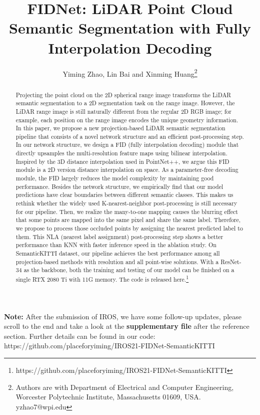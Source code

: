 \documentclass[letterpaper, 10 pt, conference]{ieeeconf}
\title{\LARGE \bf
FIDNet: LiDAR Point Cloud Semantic Segmentation with Fully Interpolation Decoding}
\author{Yiming Zhao, Lin Bai and Xinming Huang\thanks{Authors are with Department of Electrical and Computer Engineering, Worcester Polytechnic Institute,
        Massachusetts 01609, USA.
        yzhao7@wpi.edu}}
\begin{document}
\maketitle
\thispagestyle{empty}
\pagestyle{empty}




\textbf{Note: }  After the submission of IROS, we have some follow-up updates, please scroll to the end and take a look at the \textbf{supplementary file} after the reference section. Further details can be found in our code: https://github.com/placeforyiming/IROS21-FIDNet-SemanticKITTI \newline

\begin{abstract}

Projecting the point cloud on the 2D spherical range image transforms the LiDAR semantic segmentation to a 2D segmentation task on the range image. However, the LiDAR range image is still naturally different from the regular 2D RGB image; for example, each position on the range image encodes the unique geometry information. In this paper, we propose a new projection-based LiDAR semantic segmentation pipeline that consists of a novel network structure and an efficient post-processing step. In our network structure, we design a FID (fully interpolation decoding) module that directly upsamples the multi-resolution feature maps using bilinear interpolation. Inspired by the 3D distance interpolation used in PointNet++, we argue this FID module is a 2D version distance interpolation on  space. As a parameter-free decoding module, the FID largely reduces the model complexity by maintaining good performance. Besides the network structure, we empirically find that our model predictions have clear boundaries between different semantic classes. This makes us rethink whether the widely used K-nearest-neighbor post-processing is still necessary for our pipeline. Then, we realize the many-to-one mapping causes the blurring effect that some points are mapped into the same pixel and share the same label. Therefore, we propose to process those occluded points by assigning the nearest predicted label to them. This NLA (nearest label assignment) post-processing step shows a better performance than KNN with faster inference speed in the ablation study. On SemanticKITTI dataset, our pipeline achieves the best performance among all projection-based methods with  resolution and all point-wise solutions. With a ResNet-34 as the backbone, both the training and testing of our model can be finished on a single RTX 2080 Ti with 11G memory. The code is released here.\footnote{https://github.com/placeforyiming/IROS21-FIDNet-SemanticKITTI \hspace{0.2cm}}

\end{abstract}
\end{document}
